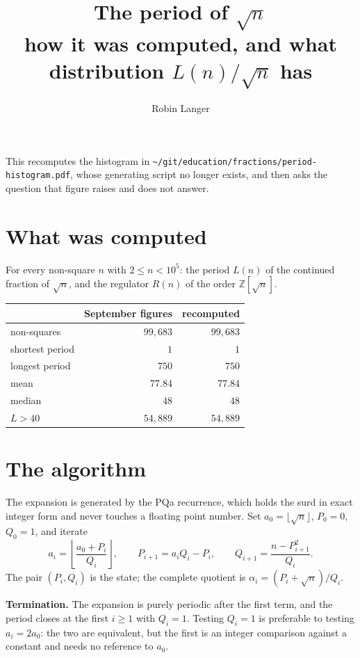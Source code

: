 \documentclass[12pt,a4paper]{article}
\title{The period of $\sqrt{n}$\\[0.4em]\large how it was computed, and what distribution $L(n)/\sqrt{n}$ has}
\author{Robin Langer}
\date{}
\begin{document}
\maketitle
\vspace{-1.5em}

This recomputes the histogram in \texttt{\textasciitilde/git/education/fractions/period-histogram.pdf}, whose generating script no longer exists, and then asks the question that figure raises and does not answer.

\section{What was computed}

For every non-square $n$ with $2 \leq n < 10^5$: the period $L(n)$ of the continued fraction of $\sqrt{n}$, and the regulator $R(n)$ of the order $\mathbb{Z}[\sqrt{n}]$.

\begin{center}
\begin{tabular}{lrr}
\toprule
 & September figures & recomputed \\
\midrule
non-squares      & $99{,}683$ & $99{,}683$ \\
shortest period  & $1$        & $1$ \\
longest period   & $750$      & $750$ \\
mean             & $77.84$    & $77.84$ \\
median           & $48$       & $48$ \\
$L > 40$         & $54{,}889$ & $54{,}889$ \\
\bottomrule
\end{tabular}
\end{center}

\section{The algorithm}

The expansion is generated by the PQa recurrence, which holds the surd in exact integer form and never touches a floating point number. Set $a_0 = \lfloor\sqrt{n}\rfloor$, $P_0 = 0$, $Q_0 = 1$, and iterate
\[
  a_i = \left\lfloor \frac{a_0 + P_i}{Q_i} \right\rfloor,
  \qquad
  P_{i+1} = a_i Q_i - P_i,
  \qquad
  Q_{i+1} = \frac{n - P_{i+1}^2}{Q_i}.
\]
The pair $(P_i,Q_i)$ is the state; the complete quotient is $\alpha_i = (P_i + \sqrt{n})/Q_i$.

\textbf{Termination.} The expansion is purely periodic after the first term, and the period closes at the first $i \geq 1$ with $Q_i = 1$. Testing $Q_i = 1$ is preferable to testing $a_i = 2a_0$: the two are equivalent, but the first is an integer comparison against a constant and needs no reference to $a_0$.
\end{document}
